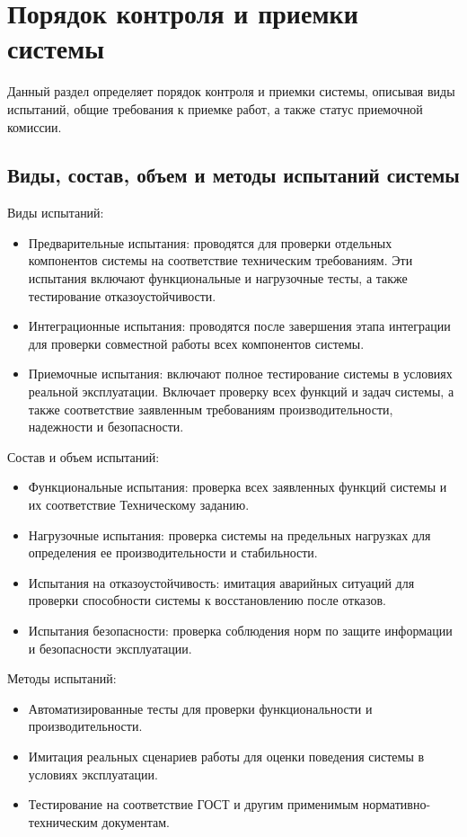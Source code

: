\section{Порядок контроля и приемки системы}

Данный раздел определяет порядок контроля и приемки системы, описывая виды испытаний, общие требования к приемке работ, а также статус приемочной комиссии.

\subsection{Виды, состав, объем и методы испытаний системы}
\noindent Виды испытаний:
\begin{itemize}
    \item Предварительные испытания: проводятся для проверки отдельных
    компонентов системы на соответствие техническим требованиям. Эти испытания
    включают функциональные и нагрузочные тесты, а также тестирование
    отказоустойчивости.
    \item Интеграционные испытания: проводятся после завершения этапа интеграции
    для проверки совместной работы всех компонентов системы.
    \item Приемочные испытания: включают полное тестирование системы в условиях
    реальной эксплуатации. Включает проверку всех функций и задач системы, а
    также соответствие заявленным требованиям производительности, надежности и
    безопасности.
\end{itemize}

\noindent Состав и объем испытаний:
\begin{itemize}
    \item Функциональные испытания: проверка всех заявленных функций системы и
    их соответствие Техническому заданию.
    \item Нагрузочные испытания: проверка системы на предельных нагрузках для
    определения ее производительности и стабильности.
    \item Испытания на отказоустойчивость: имитация аварийных ситуаций для
    проверки способности системы к восстановлению после отказов.
    \item Испытания безопасности: проверка соблюдения норм по защите информации
    и безопасности эксплуатации.
\end{itemize}

\noindent Методы испытаний:
\begin{itemize}
    \item Автоматизированные тесты для проверки функциональности и производительности.
    \item Имитация реальных сценариев работы для оценки поведения системы в условиях эксплуатации.
    \item Тестирование на соответствие ГОСТ и другим применимым нормативно-техническим документам.
\end{itemize}

